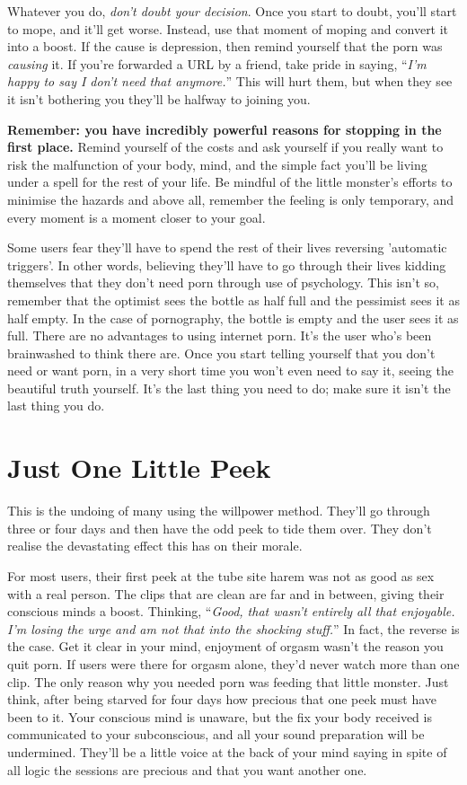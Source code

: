 \documentclass[
]{book}
\begin{document}
Whatever you do, \emph{don't doubt your decision}. Once you start to doubt, you'll start to mope, and it'll get worse. Instead, use that moment of moping and convert it into a boost. If the cause is depression, then remind yourself that the porn was \emph{causing} it. If you're forwarded a URL by a friend, take pride in saying, ``\emph{I'm happy to say I don't need that anymore.}'' This will hurt them, but when they see it isn't bothering you they'll be halfway to joining you.

\textbf{Remember: you have incredibly powerful reasons for stopping in the first place.} Remind yourself of the costs and ask yourself if you really want to risk the malfunction of your body, mind, and the simple fact you'll be living under a spell for the rest of your life. Be mindful of the little monster's efforts to minimise the hazards and above all, remember the feeling is only temporary, and every moment is a moment closer to your goal.

Some users fear they'll have to spend the rest of their lives reversing 'automatic triggers'. In other words, believing they'll have to go through their lives kidding themselves that they don't need porn through use of psychology. This isn't so, remember that the optimist sees the bottle as half full and the pessimist sees it as half empty. In the case of pornography, the bottle is empty and the user sees it as full. There are no advantages to using internet porn. It's the user who's been brainwashed to think there are. Once you start telling yourself that you don't need or want porn, in a very short time you won't even need to say it, seeing the beautiful truth yourself. It's the last thing you need to do; make sure it isn't the last thing you do.

\hypertarget{just-one-little-peek}{%
\chapter{Just One Little Peek}\label{just-one-little-peek}}

This is the undoing of many using the willpower method. They'll go through three or four days and then have the odd peek to tide them over. They don't realise the devastating effect this has on their morale.

For most users, their first peek at the tube site harem was not as good as sex with a real person. The clips that are clean are far and in between, giving their conscious minds a boost. Thinking, ``\emph{Good, that wasn't entirely all that enjoyable. I'm losing the urge and am not that into the shocking stuff.}'' In fact, the reverse is the case. Get it clear in your mind, enjoyment of orgasm wasn't the reason you quit porn. If users were there for orgasm alone, they'd never watch more than one clip. The only reason why you needed porn was feeding that little monster. Just think, after being starved for four days how precious that one peek must have been to it. Your conscious mind is unaware, but the fix your body received is communicated to your subconscious, and all your sound preparation will be undermined. They'll be a little voice at the back of your mind saying in spite of all logic the sessions are precious and that you want another one.
\end{document}
